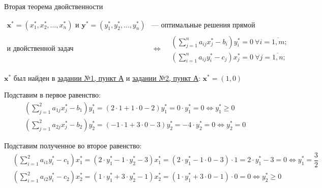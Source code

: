 \begin{Th}{Вторая теорема двойственности}\end{Th}

\begin{align*}
    \mathbf{x^{ *}} = (x_{ 1}^{ *} , x_{ 2}^{ *} , \dots , x_{ n}^{ *}) \text{ и } \mathbf{y^{ *}} = (y_{ 1}^{ *} , y_{ 2}^{ *} , \dots , y_{ n}^{ *}) & \text{--- оптимальные решения прямой} \\
    \text{и двойственной задач}
                                                                                                                                                       & \Leftrightarrow
    \begin{aligned}
         & \left(\sum_{j = 1}^{n} a_{ ij} x_{ j}^{ *} - b_{ i}\right)y_{ i}^{ *} = 0 \ \forall i = \overline{1, m}; \\
         & \left(\sum_{i=1}^{n} a_{ ij} y_{ i}^{ *} - c_{ j}\right)x_{ j}^{ *} = 0 \ \forall j = \overline{1, n};
    \end{aligned}
\end{align*}

$ \mathbf{x^{ *}} $ был найден в \hyperref[01-lab-a-answer]{задании №1, пункт А} и \hyperref[02-lab-a-answer]{задании №2, пункт А}: $ \mathbf{x^{ *}} = \left(1, 0\right) $

Подставим в первое равенство:
\begin{align*}
     & \left(\sum_{j=1}^{2} a_{ 1j}x_{j}^{ *} - b_{ 1}\right)y_{ 1}^{ *}   =  \left(2\cdot1 + 1 \cdot 0 - 2\right)y_{ 1}^{ *} = 0 \cdot y_1^*  = 0 \Leftrightarrow y_1^* \geq 0 \\
     & \left(\sum_{j=1}^{2} a_{ 2j}x_{j}^{ *} - b_{ 2}\right)y_{ 2}^{ *}   =   \left(-1 \cdot 1 + 3 \cdot 0 - 3\right)y_2^* = -4 \cdot y_2^* = 0 \Leftrightarrow y_2^* = 0
\end{align*}

Подставим полученное во второе равенство:
\begin{align*}
     & \left(\sum_{i=1}^{2} a_{ i1} y_{ i}^{ *} - c_{ 1}\right)x_{ 1}^{ *} = \left(2 \cdot y_1^* - 1 \cdot y_2^* - 3\right)x_1^* = \left(2 \cdot y_1^* - 1 \cdot 0 - 3\right) \cdot 1 = 2 \cdot y_1^* - 3 = 0 \Leftrightarrow y_1^* = \dfrac{ 3}{ 2} \\
     & \left(\sum_{i=1}^{2} a_{ i2} y_{ i}^{ *} - c_{ 2}\right)x_{ 2}^{ *} = \left(1 \cdot y_1^* + 3 \cdot y_2^* - 1\right)x_2^* = \left(1 \cdot y_1^* + 3 \cdot 0 - 1\right) \cdot 0 = 0 \Leftrightarrow y_2^* \geq 0
\end{align*}

